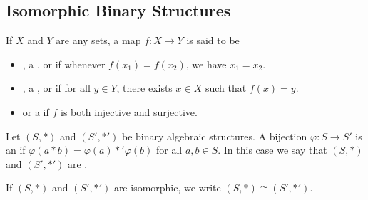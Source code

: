 \documentclass[11pt,fleqn,dvipsnames,usenames]{article}
\begin{document}
\subsection{Isomorphic Binary Structures}

\recall If $X$ and $Y$ are any sets, a map $f:X\to Y$ is said to be
\begin{itemize}
\item {}, a , or  if whenever $f(x_{1}) = f(x_{2})$, we have $x_{1} = x_{2}$.
\item {}, a , or  if for all $y\in Y$, there exists $x\in X$ such that $f(x) = y$.
\item {} or a  if $f$ is both injective and surjective.
\end{itemize}
%
\begin{definition}
Let $(S,*)$ and $(S',*')$ be binary algebraic structures.  A bijection $\varphi:S\to S'$ is an  if $\varphi(a*b) = \varphi(a)*'\varphi(b)$ for all $a,b\in S$.  In this case we say that $(S,*)$ and $(S',*')$ are .
\end{definition}
\vsp

\notation If $(S,*)$ and $(S',*')$ are isomorphic, we write $(S,*)\cong(S',*')$.
\vsp
\end{document}
